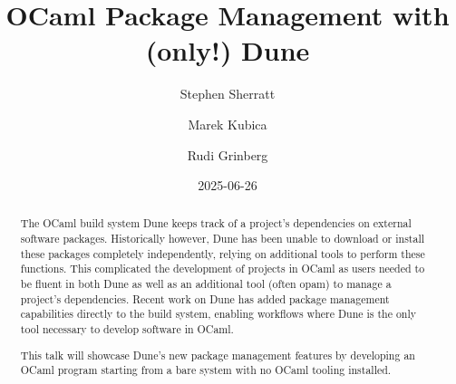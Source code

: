 \documentclass{article}
\title{\bf OCaml Package Management with (only!) Dune}
\date{2025-06-26}
\author[1]{Stephen Sherratt}
\author[1]{Marek Kubica}
\author[1]{Rudi Grinberg}
\affil[1]{Tarides}
\begin{document}
    \maketitle

    \begin{abstract}
        The OCaml build system Dune keeps track of a project's dependencies on
        external software packages. Historically however, Dune has been unable
        to download or install these packages completely independently, relying
        on additional tools to perform these functions. This complicated the
        development of projects in OCaml as users needed to be fluent in both
        Dune as well as an additional tool (often opam) to manage a project's
        dependencies. Recent work on Dune has added package management
        capabilities directly to the build system, enabling workflows where Dune
        is the only tool necessary to develop software in OCaml.

        This talk will showcase Dune's new package management features by
        developing an OCaml program starting from a bare system with no OCaml
        tooling installed.
    \end{abstract}
\end{document}

